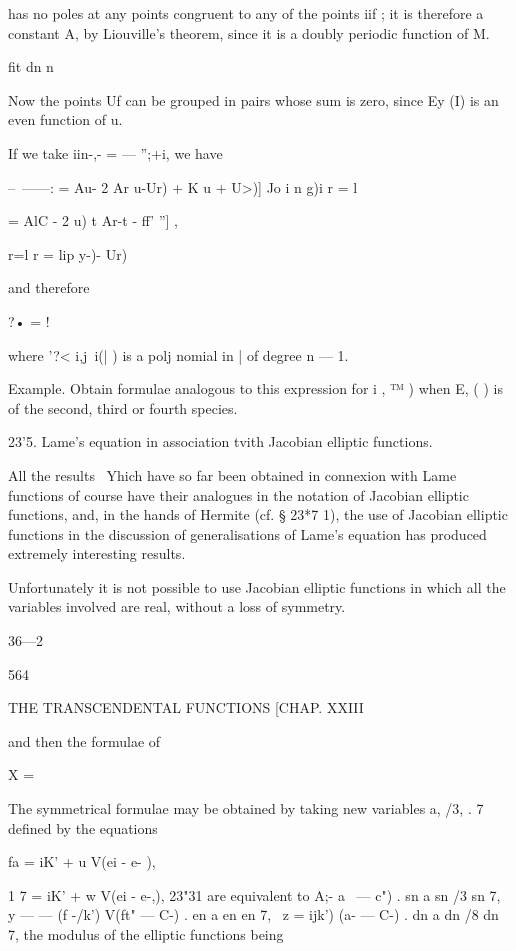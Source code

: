 {{{{{{{has no poles at any points congruent to any of the points iif ; it is
therefore a constant A, by Liouville's theorem, since it is a doubly
periodic function of M.

fit dn n

Now the points Uf can be grouped in pairs whose sum is zero, since Ey
(I) is an even function of u.

If we take iin-,- = — '';+i, we have

--~——: = Au- 2 Ar u-Ur) + K u + U>)] Jo i n g)i r = l

= AlC - 2 u) t Ar-t - ff' ''] ,

r=l r = lip y-)- Ur)

and therefore

?• = !

where '?< i,j\ i(| ) is a polj nomial in | of degree n — 1.

Example. Obtain formulae analogous to this expression for i , ™ ) when
E, ( ) is of the second, third or fourth species.

23'5. Lame's equation in association tvith Jacobian elliptic
functions.

All the results \ Yhich have so far been obtained in connexion with
Lame functions of course have their analogues in the notation of
Jacobian elliptic functions, and, in the hands of Hermite (cf. § 23*7
1), the use of Jacobian elliptic functions in the discussion of
generalisations of Lame's equation has produced extremely interesting
results.

Unfortunately it is not possible to use Jacobian elliptic functions in
which all the variables involved are real, without a loss of symmetry.

36—2



564



THE TRANSCENDENTAL FUNCTIONS [CHAP. XXIII



and then the formulae of

X =



The symmetrical formulae may be obtained by taking new variables a,
/3, . 7 defined by the equations

fa = iK' + u V(ei - e- ),

1 7 = iK' + w V(ei - e-,), 23"31 are equivalent to A;- \/ a~ — c") .
sn a sn /3 sn 7, y — — (f -/k') V(ft" — C-) . en a en en 7, \ z =
ijk') \/(a- — C-) . dn a dn /8 dn 7, the modulus of the elliptic
functions being

}}}}}}}
